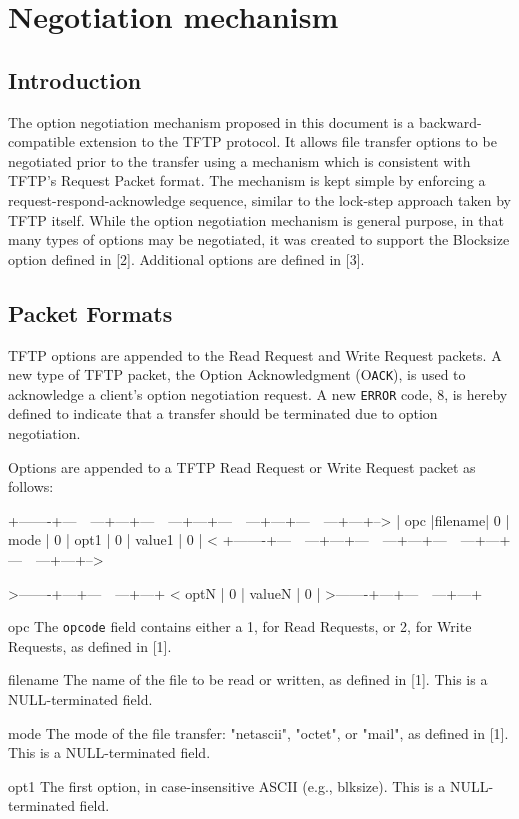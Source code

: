 \documentclass[12pt]{article}
\begin{document}
\section{Negotiation mechanism}
\subsection{Introduction}
The option negotiation mechanism proposed in this document is a
backward-compatible extension to the TFTP protocol. It allows file
transfer options to be negotiated prior to the transfer using a
mechanism which is consistent with TFTP's Request Packet format. The
mechanism is kept simple by enforcing a request-respond-acknowledge
sequence, similar to the lock-step approach taken by TFTP itself.
While the option negotiation mechanism is general purpose, in that
many types of options may be negotiated, it was created to support
the Blocksize option defined in [2]. Additional options are defined
in [3].

\subsection{Packet Formats}
TFTP options are appended to the Read Request and Write Request
packets. A new type of TFTP packet, the Option Acknowledgment
(O\verb|ACK|), is used to acknowledge a client's option negotiation request.
A new  \verb|ERROR| code, 8, is hereby defined to indicate that a transfer
should be terminated due to option negotiation.

Options are appended to a TFTP Read Request or Write Request packet
as follows:

   +-------+---~~---+---+---~~---+---+---~~---+---+---~~---+---+-->
   | opc |filename| 0 | mode | 0 | opt1 | 0 | value1 | 0 | <
   +-------+---~~---+---+---~~---+---+---~~---+---+---~~---+---+-->

    >-------+---+---~~---+---+
   < optN | 0 | valueN | 0 |
    >-------+---+---~~---+---+

   opc
     The \verb|opcode| field contains either a 1, for Read Requests, or 2,
     for Write Requests, as defined in [1].

   filename
     The name of the file to be read or written, as defined in [1].
     This is a NULL-terminated field.

   mode
     The mode of the file transfer: "netascii", "octet", or "mail",
     as defined in [1]. This is a NULL-terminated field.

   opt1
     The first option, in case-insensitive ASCII (e.g., blksize).
     This is a NULL-terminated field.
\end{document}
